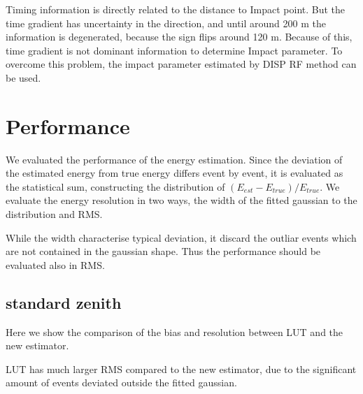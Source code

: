 \documentclass[preprint,12pt,authoryear]{elsarticle}
\begin{document}
Timing information is  directly related to the distance to Impact point.
But the time gradient has uncertainty in the direction, and 
until around 200 m the information is degenerated, because the sign flips around 120 m.
Because of this, time gradient is not dominant information to determine 
Impact parameter.
To overcome this problem, the impact parameter estimated by DISP RF method can be used.








\section{Performance}
We evaluated the performance of the energy estimation.
Since the deviation of the estimated energy from true energy
 differs event by event, it is evaluated as the statistical sum, 
 constructing the distribution of $(E_{est} - E_{true})/E_{true}$.
We evaluate the energy resolution in two ways, the width of the fitted gaussian to the distribution and  RMS.

While the width characterise typical deviation, it discard the outliar events which are not contained in the gaussian shape. Thus the performance should be evaluated also in RMS. 


\subsection{standard zenith }
Here we show the comparison of the bias and resolution between LUT and the new estimator. 


LUT has much larger RMS compared to the new estimator, due to the significant amount of events deviated outside the fitted gaussian.
\end{document}
